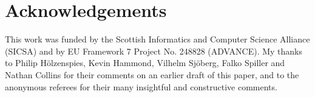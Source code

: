 \documentclass{jfp1}
\newcounter{per}
\begin{document}


%





%

%



\section*{Acknowledgements}

This work was funded by the Scottish Informatics and Computer Science Alliance
(SICSA) and by EU Framework 7 Project No. 248828 (ADVANCE).  My thanks to
Philip H\"{o}lzenspies, Kevin Hammond, Vilhelm Sj\"{o}berg, Falko Spiller
and Nathan Collins
for their comments on an earlier draft of this paper, and to the anonymous
referees for their many insightful and constructive comments.




\appendix





%
\end{document}
